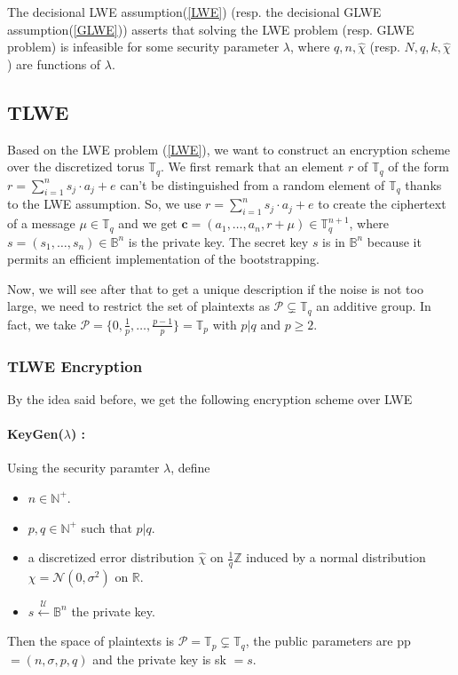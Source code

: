 \documentclass{article}
\newcommand{\Z}{\mathbb{Z}}
\newcommand{\N}{\mathbb{N}}
\newcommand{\R}{\mathbb{R}}
\newcommand{\T}{\mathbb{T}}
\newcommand{\B}{\mathbb{B}}
\newcommand{\Sunif}{\xleftarrow{\mathcal{U}}}
\newcommand{\ChiChap}{\hat{\chi}}
\theoremstyle{definition}
\theoremstyle{Theorem}
\begin{document}
 The decisional LWE assumption(\ref{LWE}) (resp. the decisional GLWE assumption(\ref{GLWE})) asserts that solving the LWE problem (resp. GLWE problem) is infeasible for some security parameter $\lambda$, where $q,n,\ChiChap$ (resp. $N,q,k,\ChiChap$) are functions of $\lambda$. 


\subsection{TLWE}

Based on the LWE problem (\ref{LWE}), we want to construct an encryption scheme over the discretized torus $\T_q$. We first remark that an element $r$ of $\T_q$ of the form $r = \sum_{i=1}^{n}s_j \cdot a_j + e$ can't be distinguished from a random element of $\T_q$ thanks to the LWE assumption. So, we use $r = \sum_{i=1}^{n}s_j \cdot a_j + e$ to create the ciphertext of a message $\mu\in\T_q$ and we get $\mathbf{c}=(a_1,\ldots,a_n,r+\mu)\in\T_q^{n+1}$, where $s = (s_1,\ldots,s_n)\in\B^n$ is the private key. The secret key $s$ is in $\B^n$ because it permits an efficient implementation of the bootstrapping. 

Now, we will see after that to get a unique description if the noise is not too large, we need to restrict the set of plaintexts as $\mathcal{P} \subsetneq \T_q$ an additive group. In fact, we take $\mathcal{P} = \{0,\frac{1}{p},\ldots,\frac{p-1}{p}\} = \T_p$ with $p|q$ and $p\geq2$.

\subsubsection{TLWE Encryption}

By the idea said before, we get the following encryption scheme over LWE

\paragraph{KeyGen($\lambda$) :}
Using the security paramter $\lambda$, define 
\begin{itemize}
    \item $n\in\N^+$.
    \item $p,q \in \N^+$ such that $p|q$.
    \item a discretized error distribution $\ChiChap$ on $\frac{1}{q}\Z$ induced by a normal distribution $\chi=\mathcal{N}(0,\sigma^2)$ on $\R$.
    \item $s \Sunif \B^n$ the private key.
\end{itemize}
Then the space of plaintexts is $\mathcal{P}=\T_p\subsetneq\T_q$, the public parameters are pp $= ({n,\sigma},p,q)$ and the private key is sk $= s$.
\end{document}
